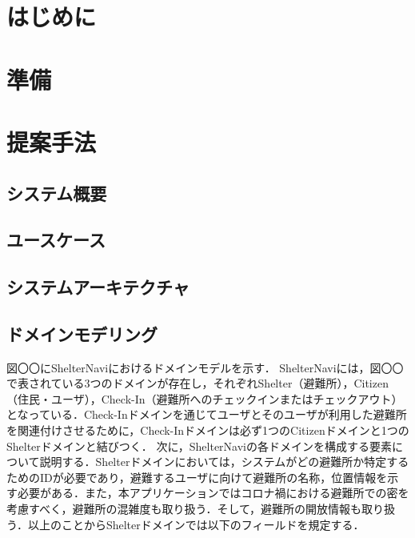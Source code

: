\documentclass[technicalreport]{ieicej}
\begin{document}
\begin{jabstract}
\end{jabstract}
\begin{jkeyword}
\end{jkeyword}
\begin{eabstract}
\end{eabstract}
\begin{ekeyword}
\end{ekeyword}
\maketitle

\section{はじめに}

\section{準備}

\section{提案手法}
\subsection{システム概要}

\subsection{ユースケース}

\subsection{システムアーキテクチャ}

\subsection{ドメインモデリング}
図〇〇にShelterNaviにおけるドメインモデルを示す．
ShelterNaviには，図〇〇で表されている3つのドメインが存在し，それぞれShelter（避難所），Citizen（住民・ユーザ），Check-In（避難所へのチェックインまたはチェックアウト）となっている．Check-Inドメインを通じてユーザとそのユーザが利用した避難所を関連付けさせるために，Check-Inドメインは必ず1つのCitizenドメインと1つのShelterドメインと結びつく．
次に，ShelterNaviの各ドメインを構成する要素について説明する．Shelterドメインにおいては，システムがどの避難所か特定するためのIDが必要であり，避難するユーザに向けて避難所の名称，位置情報を示す必要がある．また，本アプリケーションではコロナ禍における避難所での密を考慮すべく，避難所の混雑度も取り扱う．そして，避難所の開放情報も取り扱う．以上のことからShelterドメインでは以下のフィールドを規定する．
\end{document}
